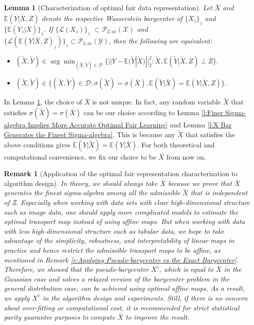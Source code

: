 \documentclass[twoside,11pt]{article}
\newtheorem{lem}{Lemma}[section]{\bfseries}{\itshape}
\newtheorem{rema}{Remark}[section]{\bfseries}{\itshape}
\begin{document}
\begin{lem}[Characterization of optimal fair data representation] \label{l:Characterization of Optimal Fair Data Representation} Let $\bar{X}$ and $\overline{\mathbb{E} (Y| \bar{X},Z)}$ denote the respective Wasserstein barycenter of $\{X_z\}_z$ and $\{\mathbb{E}(Y_z| \bar{X})\}_z$. If $\{\mathcal{L} (X_z)\}_z$ $\subset \mathcal{P}_{2,ac}(\mathcal{X})$ and $\{\mathcal{L} (\mathbb{E}(Y|\bar{X},Z)_z)\}_z \subset \mathcal{P}_{2,ac}(\mathcal{Y})$,  then the following are equivalent:
\begin{itemize}
\item $(\tilde{X},\tilde{Y}) \in \arg\min_{(\tilde{X},\tilde{Y}) \in \mathcal{D}} \{ ||Y - \mathbb{E}(\tilde{Y}|\tilde{X})||^2_2: \tilde{X}, \mathbb{E}(\tilde{Y}|\tilde{X},Z) \perp Z \}$.
\item $(\tilde{X},\tilde{Y}) \in \{(\tilde{X},\tilde{Y}) \in \mathcal{D} : \sigma(\tilde{X}) = \sigma(\bar{X}), \mathbb{E}(\tilde{Y}|\bar{X}) = \overline{\mathbb{E} (Y| \bar{X},Z)} \}$.
\end{itemize}
\end{lem}

In Lemma \ref{l:Characterization of Optimal Fair Data Representation}, the choice of $\bar{X}$ is not unique. In fact, any random variable $\tilde{X}$ that satisfies $\sigma(\tilde{X}) = \sigma(\bar{X})$ can be our choice according to Lemma \ref{l:Finer Sigma-algebra Implies More Accurate Optimal Fair Learning} and Lemma \ref{l:X Bar Generates the Finest Sigma-algebra}. This is because any $\tilde{X}$ that satisfies the above conditions gives $\mathbb{E}(Y|\tilde{X}) = \mathbb{E}(Y|\bar{X})$. For both theoretical and computational convenience, we fix our choice to be $\bar{X}$ from now on. \\

\begin{rema}[Application of the optimal fair representation characterization to algorithm design]
In theory, we should always take $\bar{X}$ because we prove that $\bar{X}$ generates the finest sigma-algebra among all the admissible $\tilde{X}$ that is independent of Z. Especially when working with data sets with clear high-dimensional structure such as image data, one should apply more complicated models to estimate the optimal transport map instead of using affine maps. But when working with data with less high-dimensional structure such as tabular data, we hope to take advantage of the simplicity, robustness, and interpretability of linear maps in practice and hence restrict the admissible transport maps to be affine, as mentioned in Remark \ref{r:Applying Pseudo-barycenter vs the Exact Barycenter}. Therefore, we showed that the pseudo-barycenter $X^{\dagger}$, which is equal to $\bar{X}$ in the Gaussian case and solves a relaxed version of the barycenter problem in the general distribution case, can be achieved using optimal affine maps. As a result, we  apply $X^{\dagger}$ in the algorithm design and experiments. Still, if there is no concern about over-fitting or computational cost, it is recommended for strict statistical parity guarantee purposes to compute $\bar{X}$ to improve the result.
\end{rema}
\end{document}
